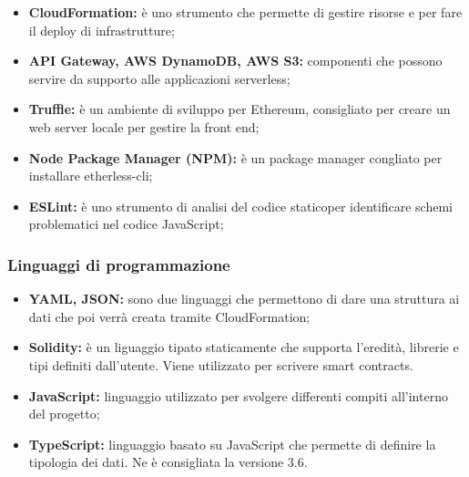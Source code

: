 \begin{itemize}
    		 \item \textbf{CloudFormation: }è uno strumento che permette di gestire risorse e per fare il deploy di infrastrutture;
    		 \item \textbf{API Gateway, AWS DynamoDB, AWS S3: }componenti che possono servire da supporto alle applicazioni serverless;
    		 \item \textbf{Truffle: }è un ambiente di sviluppo per Ethereum, consigliato per creare un web server locale per gestire la front end;
    		 \item \textbf{Node Package Manager (NPM): }è un package manager congliato per installare etherless-cli;
    		 \item \textbf{ESLint: }è uno strumento di analisi del codice staticoper identificare schemi problematici nel codice JavaScript;
    		 
	\end{itemize}     	
        \subsubsection{Linguaggi di programmazione}
        \begin{itemize}
        		\item \textbf{YAML, JSON: }sono due linguaggi che permettono di dare una struttura ai dati che poi verrà creata  tramite CloudFormation;
        		\item \textbf{Solidity: }è un liguaggio tipato staticamente che supporta l'eredità, librerie e tipi definiti dall'utente. Viene utilizzato per scrivere smart contracts.	
        		\item \textbf{JavaScript: } linguaggio utilizzato per svolgere differenti compiti all'interno del progetto;
        		\item \textbf{TypeScript: }linguaggio basato su JavaScript che  permette di definire la tipologia dei dati. Ne è consigliata la versione 3.6.
        \end{itemize}
      
